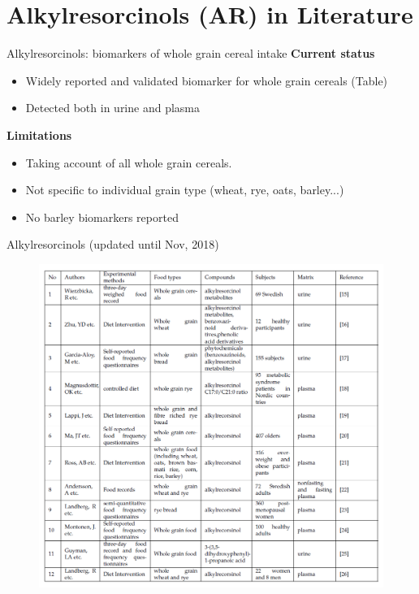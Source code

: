 \documentclass{beamer}
\begin{document}
\section{Alkylresorcinols (AR) in Literature}
\begin{frame}{Alkylresorcinols: biomarkers of whole grain cereal intake}
\textbf{Current status}
\begin{itemize}
	\item Widely reported and validated biomarker for whole grain cereals (Table)
	\item Detected both in urine and plasma
\end{itemize}

\textbf{Limitations}
\begin{itemize}
	\item Taking account of all whole grain cereals. 
	\item Not specific to individual grain type (wheat, rye, oats, barley...)
	\item No barley biomarkers reported
\end{itemize}
\end{frame}


\begin{frame}{Alkylresorcinols (updated until Nov, 2018)}
\begin{figure}[h]
    \centering
    \includegraphics[scale=0.32]{images/alkylresorcinols.png}
\end{figure}
\end{frame}
\end{document}
